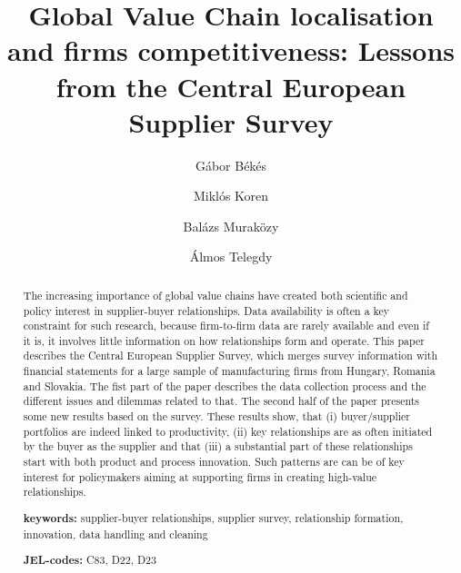 \documentclass[final, dvipsnames, authoryear,12pt]{elsarticle}
\begin{document}
\begin{frontmatter}
\title{Global Value Chain localisation and firms competitiveness: Lessons from the Central European Supplier Survey}






\author[gb]{G\'{a}bor B\'{e}k\'{e}s}
\author[mk]{Miklós Koren}
\author[bm]{Balázs Muraközy}
\author[at]{Álmos Telegdy}
 \address[gb]{Central European University, Institute of Economics and CEPR}
 \address[mk]{Central European University, Institute of Economics and CEPR}
 \address[bm]{University of Liverpool, Institute of Economics }
 \address[at]{National Bank of Hungary}
 
 




\begin{abstract}
    The increasing importance of global value chains have created both scientific and policy interest in supplier-buyer relationships. Data availability is often a key constraint for such research, because firm-to-firm data are rarely available and even if it is, it involves little information on how relationships form and operate. This paper describes the Central European Supplier Survey, which merges survey information with financial statements for a large sample of manufacturing firms from Hungary, Romania and Slovakia. The fist part of the paper describes the data collection process and the different issues and dilemmas related to that. The second half of the paper presents some new results based on the survey. These results show, that (i) buyer/supplier portfolios are indeed linked to productivity, (ii) key relationships are as often initiated by the buyer as the supplier and that (iii) a substantial part of these relationships start with both product and process innovation. Such patterns are can be of key interest for policymakers aiming at supporting firms in creating high-value relationships.
    
       \vspace{2mm} 
   
   \textbf{keywords:} supplier-buyer relationships, supplier survey, relationship formation, innovation, data handling and cleaning 
   
    \vspace{2mm}
    
   \textbf{JEL-codes:} C83, D22, D23 
\end{abstract}


\end{frontmatter}
\end{document}
